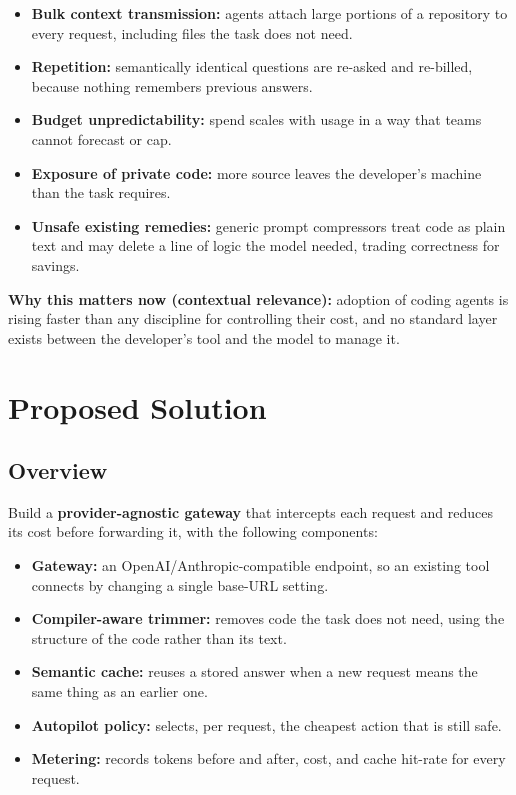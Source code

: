 \documentclass[11pt,a4paper]{article}
\begin{document}
\begin{itemize}[noitemsep]
  \item \textbf{Bulk context transmission:} agents attach large portions of a
        repository to every request, including files the task does not need.
  \item \textbf{Repetition:} semantically identical questions are re-asked and
        re-billed, because nothing remembers previous answers.
  \item \textbf{Budget unpredictability:} spend scales with usage in a way that
        teams cannot forecast or cap.
  \item \textbf{Exposure of private code:} more source leaves the developer's
        machine than the task requires.
  \item \textbf{Unsafe existing remedies:} generic prompt compressors treat code
        as plain text and may delete a line of logic the model needed, trading
        correctness for savings.
\end{itemize}

\textbf{Why this matters now (contextual relevance):} adoption of coding agents
is rising faster than any discipline for controlling their cost, and no standard
layer exists between the developer's tool and the model to manage it.

\section{Proposed Solution}

\subsection{Overview}
Build a \textbf{provider-agnostic gateway} that intercepts each request and
reduces its cost before forwarding it, with the following components:

\begin{itemize}[noitemsep]
  \item \textbf{Gateway:} an OpenAI/Anthropic-compatible endpoint, so an
        existing tool connects by changing a single base-URL setting.
  \item \textbf{Compiler-aware trimmer:} removes code the task does not need,
        using the structure of the code rather than its text.
  \item \textbf{Semantic cache:} reuses a stored answer when a new request means
        the same thing as an earlier one.
  \item \textbf{Autopilot policy:} selects, per request, the cheapest action that
        is still safe.
  \item \textbf{Metering:} records tokens before and after, cost, and cache
        hit-rate for every request.
\end{itemize}
\end{document}
